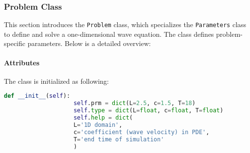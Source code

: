 \documentclass{article}
\begin{document}
		\begin{comment}
			
		In the context of solving the wave equation, the \texttt{Parameters} class underpins the simulation's configuration, managing key inputs such as:
		\begin{itemize}
			\item Time step (\texttt{dt}),
			\item Grid size (\texttt{dx}),
			\item Wave speed (\texttt{c}),
			\item Boundary conditions.
		\end{itemize}
		This ensures consistency and correctness in the solver's input parameters, forming a reliable foundation for the numerical solution process.
		content...
		\end{comment}
		
		\subsubsection{Problem Class}
			This section introduces the \texttt{Problem} class, which specializes the \texttt{Parameters} class to define and solve a one-dimensional wave equation. The class defines problem-specific parameters. Below is a detailed overview:
			
			\begin{comment}
			
			\paragraph{Purpose} 
			The \texttt{Problem} class provides a mathematical framework for the wave equation:
			\[
			u_{tt} = (c^2 u_x)_x + f(x, t), \quad t \in [0, T], \, x \in (0, L).
			\]
			It employs the method of manufactured solutions to define an exact solution, aiding the validation of numerical solvers.
			
			\paragraph{Manufactured Solution} 
			The exact solution is defined as:
			\[
			u(x, t) = x(L - x)(1 + t^2),
			\]
			ensuring simple boundary and initial conditions while enabling analytical computation.
				content...
			\end{comment}
			\paragraph{Attributes}
			The class is initialized as following:
			\begin{lstlisting}[language=Python]
				def __init__(self):
					self.prm = dict(L=2.5, c=1.5, T=18)
					self.type = dict(L=float, c=float, T=float)
					self.help = dict(
					L='1D domain', 
					c='coefficient (wave velocity) in PDE', 
					T='end time of simulation'
					)
			\end{lstlisting}
			
\end{document}

